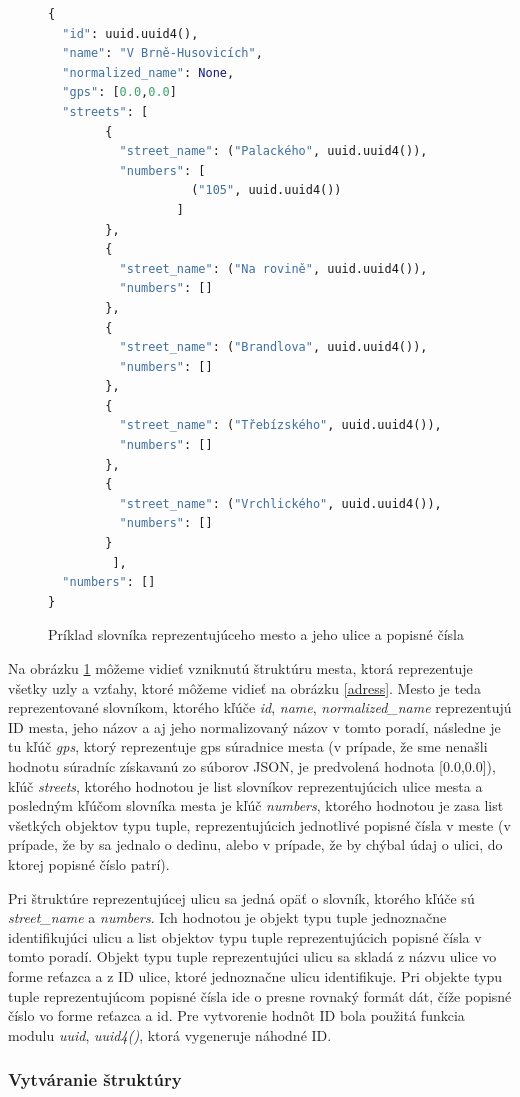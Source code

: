 \begin{figure}[H]
    \centering
    \begin{lstlisting}[language=python]
{
  "id": uuid.uuid4(),
  "name": "V Brně-Husovicích",
  "normalized_name": None,
  "gps": [0.0,0.0]
  "streets": [
		{
		  "street_name": ("Palackého", uuid.uuid4()),
		  "numbers": [
			     	("105", uuid.uuid4())
			      ]
		},
		{
		  "street_name": ("Na rovině", uuid.uuid4()),
		  "numbers": []
		},
		{
		  "street_name": ("Brandlova", uuid.uuid4()),
		  "numbers": []
		},
		{
		  "street_name": ("Třebízského", uuid.uuid4()),
		  "numbers": []
		},
		{
		  "street_name": ("Vrchlického", uuid.uuid4()),
		  "numbers": []
		}
	     ],
  "numbers": []
}
    \end{lstlisting}
    \caption{Príklad slovníka reprezentujúceho mesto a jeho ulice a popisné čísla}
    \label{townstruct}
\end{figure}

Na obrázku \ref{townstruct} môžeme vidieť vzniknutú štruktúru mesta, ktorá reprezentuje všetky uzly a vzťahy, ktoré môžeme vidieť na obrázku \ref{adress}. Mesto je teda reprezentované slovníkom, ktorého kľúče \textit{id}, \textit{name}, \textit{normalized\_name} reprezentujú ID mesta, jeho názov a aj jeho normalizovaný názov v tomto poradí, následne je tu kľúč \textit{gps}, ktorý reprezentuje gps súradnice mesta (v prípade, že sme nenašli hodnotu súradníc získavanú zo súborov JSON, je predvolená hodnota [0.0,0.0]), kľúč \textit{streets}, ktorého hodnotou je list slovníkov reprezentujúcich ulice mesta a posledným kľúčom slovníka mesta je kľúč \textit{numbers}, ktorého hodnotou je zasa list všetkých objektov typu tuple, reprezentujúcich jednotlivé popisné čísla v meste (v prípade, že by sa jednalo o dedinu, alebo v prípade, že by chýbal údaj o ulici, do ktorej popisné číslo patrí).

Pri štruktúre reprezentujúcej ulicu sa jedná opäť o slovník, ktorého kľúče sú \textit{street\_name} a \textit{numbers}. Ich hodnotou je objekt typu tuple jednoznačne identifikujúci ulicu a list objektov typu tuple reprezentujúcich popisné čísla v tomto poradí. Objekt typu tuple reprezentujúci ulicu sa skladá z názvu ulice vo forme reťazca a z ID ulice, ktoré jednoznačne ulicu identifikuje. Pri objekte typu tuple reprezentujúcom popisné čísla ide o presne rovnaký formát dát, číže popisné číslo vo forme reťazca a id. Pre vytvorenie hodnôt ID bola použitá funkcia modulu \textit{uuid}, \textit{uuid4()}, ktorá vygeneruje náhodné ID.

\subsubsection{Vytváranie štruktúry}

